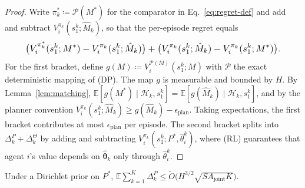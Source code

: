\begin{proof}
Write $\pi_k^* \coloneqq \mathcal P(M^*)$ for the comparator in Eq.~\eqref{eq:regret-def} and add and subtract $V_i^{\pi_k}(s_1^k; \hat M_k)$, so that the per-episode regret equals
\begin{equation*}\resizebox{0.9\linewidth}{!}{$\displaystyle \big(V_i^{\pi_k^*}(s_1^k; M^*) - V_i^{\pi_k}(s_1^k; \hat M_k)\big) + \big(V_i^{\pi_k}(s_1^k;\hat M_k) - V_i^{\pi_k}(s_1^k; M^*)\big). $}\end{equation*}
For the first bracket, define $g(M) \coloneqq V_i^{\mathcal P(M)}(s_1^k; M)$ with $\mathcal P$ the exact deterministic mapping of (DP). The map $g$ is measurable and bounded by $H$. By Lemma~\ref{lem:matching}, $\mathbb{E}[g(M^*) \mid \mathcal H_k, s_1^k] = \mathbb{E}[g(\hat M_k) \mid \mathcal H_k, s_1^k]$, and by the planner convention $V_i^{\pi_k}(s_1^k; \hat M_k) \ge g(\hat M_k) - \epsilon_{\mathrm{plan}}$. Taking expectations, the first bracket contributes at most $\epsilon_{\mathrm{plan}}$ per episode. The second bracket splits into $\Delta_k^P + \Delta_k^\Theta$ by adding and subtracting $V_i^{\pi_k}(s_1^k; P^*, \hat\theta_i^k)$, where (RL) guarantees that agent $i$'s value depends on $\hat{\boldsymbol\theta}_k$ only through $\hat\theta_i^k$.
\end{proof}

\begin{lemma}
\label{lem:transition}
Under a Dirichlet prior on $P^*$,
$\mathbb{E}\sum_{k=1}^K \Delta_k^P \le \tilde O\big(H^{3/2}\sqrt{S A_{\mathrm{joint}} K}\big)$.
\end{lemma}

